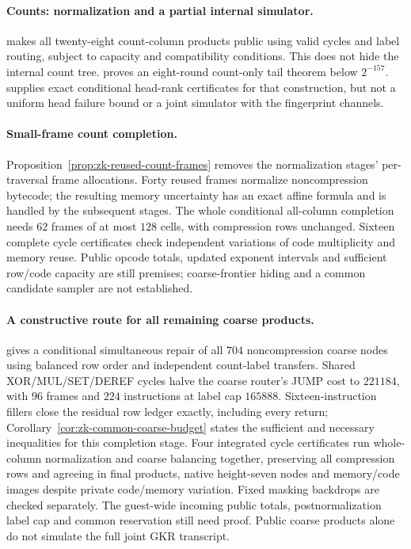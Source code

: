 \paragraph{Counts: normalization and a partial internal simulator.}  makes all twenty-eight count-column products public using valid cycles and label routing, subject to capacity and compatibility conditions. This does not hide the internal count tree.  proves an eight-round count-only tail theorem below $2^{-157}$.  supplies exact conditional head-rank certificates for that construction, but not a uniform head failure bound or a joint simulator with the fingerprint channels.

\paragraph{Small-frame count completion.} Proposition~\ref{prop:zk-reused-count-frames} removes the normalization stages' per-traversal frame allocations. Forty reused frames normalize noncompression bytecode; the resulting memory uncertainty has an exact affine formula and is handled by the subsequent stages. The whole conditional all-column completion needs $62$ frames of at most $128$ cells, with compression rows unchanged. Sixteen complete cycle certificates check independent variations of code multiplicity and memory reuse. Public opcode totals, updated exponent intervals and sufficient row/code capacity are still premises; coarse-frontier hiding and a common candidate sampler are not established.

\paragraph{A constructive route for all remaining coarse products.}  gives a conditional simultaneous repair of all $704$ noncompression coarse nodes using balanced row order and independent count-label transfers. Shared XOR/MUL/SET/DEREF cycles halve the coarse router's JUMP cost to $221184$, with $96$ frames and $224$ instructions at label cap $165888$. Sixteen-instruction fillers close the residual row ledger exactly, including every return; Corollary~\ref{cor:zk-common-coarse-budget} states the sufficient and necessary inequalities for this completion stage. Four integrated cycle certificates run whole-column normalization and coarse balancing together, preserving all compression rows and agreeing in final products, native height-seven nodes and memory/code images despite private code/memory variation. Fixed masking backdrops are checked separately. The guest-wide incoming public totals, postnormalization label cap and common reservation still need proof. Public coarse products alone do not simulate the full joint GKR transcript.


